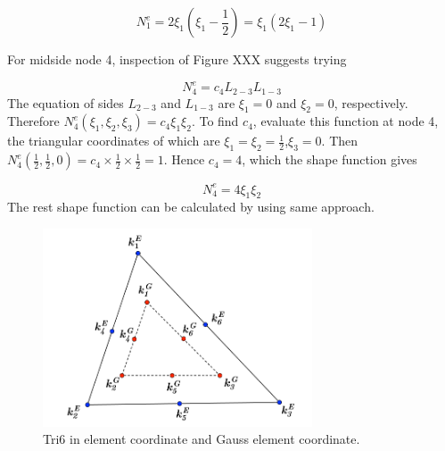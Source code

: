 \documentclass{article}
\begin{document}
\begin{equation}
N_1^e = 2\xi_1\left(\xi_1 - \frac{1}{2}\right) = \xi_1 \left(2 \xi_1 -1 \right)
\end{equation} 

For midside node 4, inspection of Figure XXX suggests trying

\begin{equation}
N_4^e = c_4L_{2-3}L_{1-3}
\end{equation}
The equation of sides $L_{2-3}$ and $L_{1-3}$ are $\xi_1 = 0$ and $\xi_2 = 0$, respectively. Therefore $N_4^e\left(\xi_1, \xi_2, \xi_3\right) = c_4\xi_1\xi_2$. To find $c_4$, evaluate this function at node 4, the triangular coordinates of which are $\xi_1 = \xi_2 = \frac{1}{2}$,$\xi_3 = 0$. Then $N_4^e\left(\frac{1}{2}, \frac{1}{2}, 0\right) = c_4 \times \frac{1}{2} \times \frac{1}{2} = 1$. Hence $c_4 = 4$, which the shape function gives

\begin{equation}
N_4^e = 4\xi_1\xi_2
\end{equation}
The rest shape function can be calculated by using same approach. 
\begin{center}
	
\end{center}

\begin{figure}[h]
	\begin{center}
		\includegraphics[width=8cm,clip]{Tri6_1.pdf} 		
		\caption{Tri6 in element coordinate and Gauss element coordinate.} \label{fig: Tri6_1}	
	\end{center} 
\end{figure}
\end{document}
